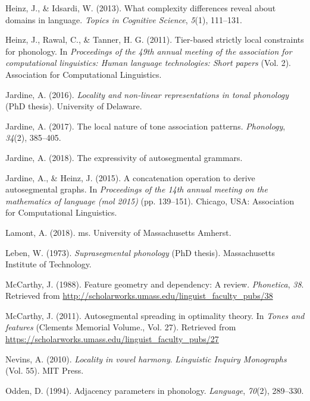 \documentclass[,doc,floatsintext]{apa6}
\theoremstyle{definition}
\theoremstyle{definition}
\theoremstyle{definition}
\theoremstyle{remark}
\begin{document}
\hypertarget{ref-heinzidsardi2013}{}
Heinz, J., \& Idsardi, W. (2013). What complexity differences reveal
about domains in language. \emph{Topics in Cognitive Science},
\emph{5}(1), 111--131.

\hypertarget{ref-heinzetaltsl}{}
Heinz, J., Rawal, C., \& Tanner, H. G. (2011). Tier-based strictly local
constraints for phonology. In \emph{Proceedings of the 49th annual
meeting of the association for computational linguistics: Human language
technologies: Short papers} (Vol. 2). Association for Computational
Linguistics.

\hypertarget{ref-jardinediss}{}
Jardine, A. (2016). \emph{Locality and non-linear representations in
tonal phonology} (PhD thesis). University of Delaware.

\hypertarget{ref-jardinelocaltone}{}
Jardine, A. (2017). The local nature of tone association patterns.
\emph{Phonology}, \emph{34}(2), 385--405.

\hypertarget{ref-jardineexpressag}{}
Jardine, A. (2018). The expressivity of autosegmental grammars.

\hypertarget{ref-jardineheinz2015}{}
Jardine, A., \& Heinz, J. (2015). A concatenation operation to derive
autosegmental graphs. In \emph{Proceedings of the 14th annual meeting on
the mathematics of language (mol 2015)} (pp. 139--151). Chicago, USA:
Association for Computational Linguistics.

\hypertarget{ref-lamont2018}{}
Lamont, A. (2018). ms. University of Massachusetts Amherst.

\hypertarget{ref-leben1973}{}
Leben, W. (1973). \emph{Suprasegmental phonology} (PhD thesis).
Massachusetts Institute of Technology.

\hypertarget{ref-mccarthyfg1988}{}
McCarthy, J. (1988). Feature geometry and dependency: A review.
\emph{Phonetica}, \emph{38}. Retrieved from
\url{http://scholarworks.umass.edu/linguist_faculty_pubs/38}

\hypertarget{ref-mccarthy2011}{}
McCarthy, J. (2011). Autosegmental spreading in optimality theory. In
\emph{Tones and features} (Clements Memorial Volume., Vol. 27).
Retrieved from
\url{https://scholarworks.umass.edu/linguist_faculty_pubs/27}

\hypertarget{ref-Nevins2010}{}
Nevins, A. (2010). \emph{Locality in vowel harmony}. \emph{Linguistic
Inquiry Monographs} (Vol. 55). MIT Press.

\hypertarget{ref-odden1994}{}
Odden, D. (1994). Adjacency parameters in phonology. \emph{Language},
\emph{70}(2), 289--330.
\end{document}
